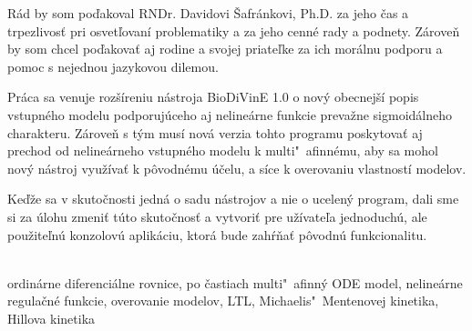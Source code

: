 \documentclass[11pt,final,oneside]{fithesis}
\begin{document}
\FrontMatter
\ThesisTitlePage


\begin{ThesisDeclaration}
\DeclarationText
\AdvisorName
\end{ThesisDeclaration}

\begin{ThesisThanks}
R\'ad by som po\v dakoval RNDr. Davidovi \v Safr\'ankovi, Ph.D. za jeho \v cas a trpezlivos\v t pri osvet\v lovan\'i problematiky a za jeho cenn\'e rady a 
podnety.
Z\'arove\v n by som chcel po\v dakova\v t aj rodine a svojej priate\v lke za ich mor\'alnu podporu a pomoc s nejednou jazykovou dilemou.
\end{ThesisThanks}

\begin{ThesisAbstract}
Pr\'aca sa venuje roz\v s\'ireniu n\'astroja BioDiVinE 1.0 o nov\'y obecnej\v s\'i popis vstupn\'eho modelu podporuj\'uceho aj neline\'arne funkcie 
preva\v zne sigmoid\'alneho charakteru. Z\'arove\v n s t\'ym mus\'i nov\'a verzia tohto programu poskytova\v t aj prechod od neline\'arneho vstupn\'eho
modelu k multi"~afinn\'emu, aby sa mohol nov\'y n\'astroj vyu\v z\'iva\v t k p\^ ovodn\'emu \'u\v celu, a s\'ice k overovaniu vlastnost\'i modelov.

Ke\v d\v ze sa v skuto\v cnosti jedn\'a o sadu n\'astrojov a nie o ucelen\'y program, dali sme si za \'ulohu zmeni\v t t\'uto skuto\v cnos\v t a vytvori\v t
pre u\v z\'ivate\v la jednoduch\'u, ale pou\v zite\v ln\'u konzolov\'u aplik\'aciu, ktor\'a bude zah\'r\v na\v t p\^ ovodn\'u funkcionalitu.\\\\



\end{ThesisAbstract}

\begin{ThesisKeyWords}
ordin\'arne diferenci\'alne rovnice, po \v castiach multi"~afinn\'y ODE model, neline\'arne regula\v cn\'e funkcie, overovanie modelov, LTL, 
Michaelis"~Mentenovej kinetika, Hillova kinetika\\\\

\end{ThesisKeyWords}
\end{document}

